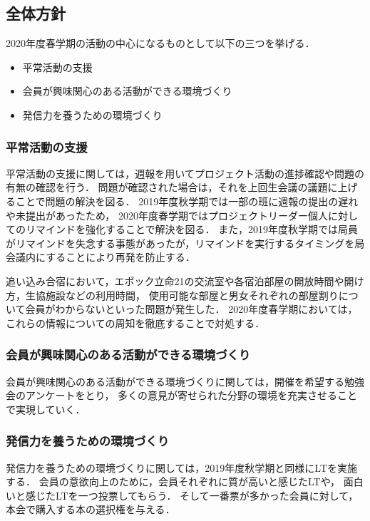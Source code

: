 \subsection*{全体方針}

2020年度春学期の活動の中心になるものとして以下の三つを挙げる．
\begin{itemize}
\item 平常活動の支援
\item 会員が興味関心のある活動ができる環境づくり
\item 発信力を養うための環境づくり
\end{itemize}

\subsubsection*{平常活動の支援}
平常活動の支援に関しては，週報を用いてプロジェクト活動の進捗確認や問題の有無の確認を行う．
問題が確認された場合は，それを上回生会議の議題に上げることで問題の解決を図る．
2019年度秋学期では一部の班に週報の提出の遅れや未提出があったため，
2020年度春学期ではプロジェクトリーダー個人に対してのリマインドを強化することで解決を図る．
また，2019年度秋学期では局員がリマインドを失念する事態があったが，リマインドを実行するタイミングを局会議内にすることにより再発を防止する．

追い込み合宿において，エポック立命21の交流室や各宿泊部屋の開放時間や開け方，生協施設などの利用時間，
使用可能な部屋と男女それぞれの部屋割りについて会員がわからないといった問題が発生した．
2020年度春学期においては，これらの情報についての周知を徹底することで対処する．

\subsubsection*{会員が興味関心のある活動ができる環境づくり}
会員が興味関心のある活動ができる環境づくりに関しては，開催を希望する勉強会のアンケートをとり，
多くの意見が寄せられた分野の環境を充実させることで実現していく．

\subsubsection*{発信力を養うための環境づくり}
発信力を養うための環境づくりに関しては，2019年度秋学期と同様にLTを実施する．
会員の意欲向上のために，会員それぞれに質が高いと感じたLTや，
面白いと感じたLTを一つ投票してもらう．
そして一番票が多かった会員に対して，本会で購入する本の選択権を与える．
